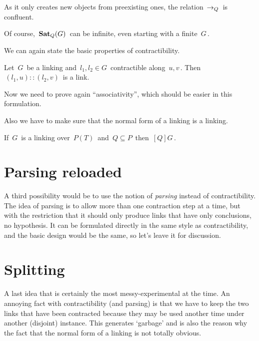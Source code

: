 As it only creates new objects from preexisting ones, the relation $\,\rightarrow_Q\,$ is confluent.

\smallskip
Of course, $\,\mathbf{Sat}_Q(G)\,$ can be infinite, even starting with a finite $\,G\,$.

\medskip
We can again state the basic properties of contractibility.

\lemma
	{Let $\,G\,$ be a linking and $\,l_1,l_2\in G\,$ contractible along $\,u,v\,$. Then $\,(l_1,u)::(l_2,v)\,$ is a link.
}


Now we need to prove again ``associativity'', which should be easier in this formulation.

\smallskip
Also we have to make sure that the normal form of a linking is a linking.

\lemma
	{If $\,G\,$ is a linking over $\,P(T)\,$ and $\,Q \subseteq P\,$ then $\,[Q]G\,$.
}


\section{Parsing reloaded}

A third possibility would be to use the notion of \textit{parsing} instead of contractibility. The idea of parsing is to allow more than one contraction step at a time, but with the restriction that it should only produce links that have only conclusions, no hypothesis. It can be formulated directly in the same style as contractibility, and the basic design would be the same, so let's leave it for discussion.

\section{Splitting}

A last idea that is certainly the most messy-experimental at the time. An annoying fact with contractibility (and parsing) is that we have to keep the two links that have been contracted because they may be used another time under another (disjoint) instance. This generates `garbage' and is also the reason why the fact that the normal form of a linking is not totally obvious.

